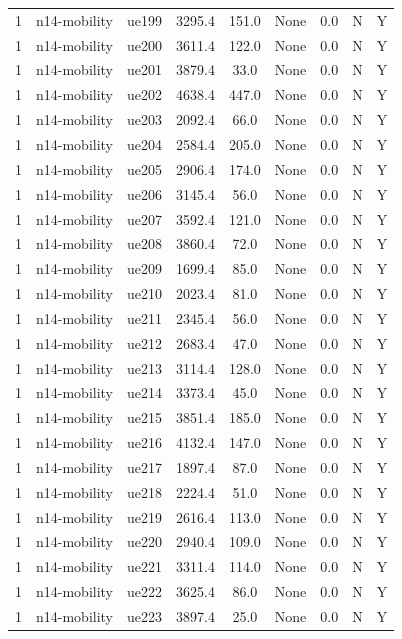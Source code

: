 \begin{table}[ht]
\begin{tabular}{|c|c|c|c|c|c|c|c|c|}
1 & n14-mobility & ue199 & 3295.4 & 151.0 & None & 0.0 & N & Y \\
1 & n14-mobility & ue200 & 3611.4 & 122.0 & None & 0.0 & N & Y \\
1 & n14-mobility & ue201 & 3879.4 & 33.0 & None & 0.0 & N & Y \\
1 & n14-mobility & ue202 & 4638.4 & 447.0 & None & 0.0 & N & Y \\
1 & n14-mobility & ue203 & 2092.4 & 66.0 & None & 0.0 & N & Y \\
1 & n14-mobility & ue204 & 2584.4 & 205.0 & None & 0.0 & N & Y \\
1 & n14-mobility & ue205 & 2906.4 & 174.0 & None & 0.0 & N & Y \\
1 & n14-mobility & ue206 & 3145.4 & 56.0 & None & 0.0 & N & Y \\
1 & n14-mobility & ue207 & 3592.4 & 121.0 & None & 0.0 & N & Y \\
1 & n14-mobility & ue208 & 3860.4 & 72.0 & None & 0.0 & N & Y \\
1 & n14-mobility & ue209 & 1699.4 & 85.0 & None & 0.0 & N & Y \\
1 & n14-mobility & ue210 & 2023.4 & 81.0 & None & 0.0 & N & Y \\
1 & n14-mobility & ue211 & 2345.4 & 56.0 & None & 0.0 & N & Y \\
1 & n14-mobility & ue212 & 2683.4 & 47.0 & None & 0.0 & N & Y \\
1 & n14-mobility & ue213 & 3114.4 & 128.0 & None & 0.0 & N & Y \\
1 & n14-mobility & ue214 & 3373.4 & 45.0 & None & 0.0 & N & Y \\
1 & n14-mobility & ue215 & 3851.4 & 185.0 & None & 0.0 & N & Y \\
1 & n14-mobility & ue216 & 4132.4 & 147.0 & None & 0.0 & N & Y \\
1 & n14-mobility & ue217 & 1897.4 & 87.0 & None & 0.0 & N & Y \\
1 & n14-mobility & ue218 & 2224.4 & 51.0 & None & 0.0 & N & Y \\
1 & n14-mobility & ue219 & 2616.4 & 113.0 & None & 0.0 & N & Y \\
1 & n14-mobility & ue220 & 2940.4 & 109.0 & None & 0.0 & N & Y \\
1 & n14-mobility & ue221 & 3311.4 & 114.0 & None & 0.0 & N & Y \\
1 & n14-mobility & ue222 & 3625.4 & 86.0 & None & 0.0 & N & Y \\
1 & n14-mobility & ue223 & 3897.4 & 25.0 & None & 0.0 & N & Y \\

\end{tabular}
\end{table}
